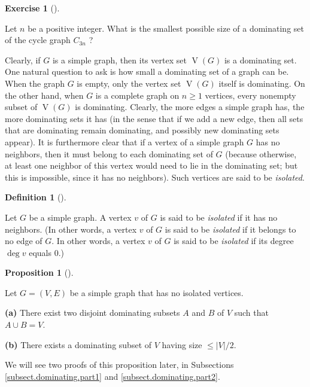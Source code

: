 \documentclass[numbers=enddot,12pt,final,onecolumn,notitlepage]{scrartcl}%
\theoremstyle{definition}
\newtheorem{prop}[theo]{Proposition}
\newenvironment{proposition}[1][]
{\begin{prop}[#1]\begin{leftbar}}
{\end{leftbar}\end{prop}}
\newtheorem{defi}[theo]{Definition}
\newenvironment{definition}[1][]
{\begin{defi}[#1]\begin{leftbar}}
{\end{leftbar}\end{defi}}
\newtheorem{exmp}[theo]{Exercise}
\newenvironment{exercise}[1][]
{\begin{exmp}[#1]\begin{leftbar}}
{\end{leftbar}\end{exmp}}
\newcommand{\abs}[1]{\left| #1 \right|}
\newcommand{\tup}[1]{\left( #1 \right)}
\newcommand{\verts}[1]{\operatorname{V}\left( #1 \right)}
\begin{document}
\begin{exercise}
Let $n$ be a positive integer.
What is the smallest possible size of a dominating
set of the cycle graph $C_{3n}$ ?
\end{exercise}

Clearly, if $G$ is a simple graph, then its vertex set $\verts{G}$ is
a dominating set.
One natural question to ask is how small a dominating set of a graph
can be. When the graph $G$ is empty, only the vertex set $\verts{G}$
itself is dominating. On the other hand, when $G$ is a complete graph
on $n \geq 1$ vertices, every nonempty subset of $\verts{G}$ is
dominating. Clearly, the more edges a simple graph has, the more
dominating sets it has (in the sense that if we add a new edge, then
all sets that are dominating remain dominating, and possibly new
dominating sets appear). It is furthermore clear that if a vertex of
a simple graph $G$ has no neighbors, then it must belong to each
dominating set of $G$ (because otherwise, at least one neighbor of
this vertex would need to lie in the dominating set; but this is
impossible, since it has no neighbors). Such vertices are said to be
\textit{isolated}.

\begin{definition} \label{def.intro.isolated}
Let $G$ be a simple graph. A vertex $v$ of $G$ is said to be
\textit{isolated} if it has no neighbors. (In other words, a vertex
$v$ of $G$ is said to be \textit{isolated} if it belongs to no edge
of $G$. In other words, a vertex
$v$ of $G$ is said to be \textit{isolated} if its degree $\deg v$
equals $0$.)
\end{definition}

\begin{proposition} \label{prop.dominating.|V|/2}
Let $G = \tup{V, E}$ be a simple graph that has no isolated vertices.

\textbf{(a)} There exist two disjoint dominating subsets $A$ and $B$
of $V$ such that $A \cup B = V$.

\textbf{(b)} There exists a dominating subset of $V$ having size
$\leq \abs{V}/2$.
\end{proposition}

We will see two proofs of this proposition later, in Subsections
\ref{subsect.dominating.part1} and \ref{subsect.dominating.part2}.
\end{document}
